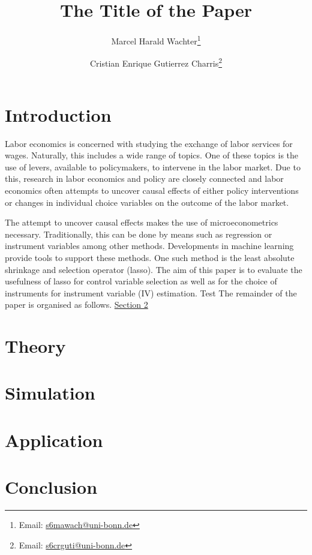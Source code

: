 \documentclass[a4paper,12pt]{article}
\author{Marcel Harald Wachter\thanks{Email: \href{mailto:s6mawach@uni-bonn.de}{s6mawach@uni-bonn.de}} \and Cristian Enrique Gutierrez Charris\thanks{Email: \href{mailto:s6crguti@uni-bonn.de}{s6crguti@uni-bonn.de}}}
\title{The Title of the Paper}
\begin{document}
\maketitle
\thispagestyle{empty}

\begin{singlespace}
\begin{abstract}

\end{abstract}
\end{singlespace}

\newpage
{}

\section{Introduction}
\label{sec:introduction}
Labor economics is concerned with studying the exchange of labor services for wages.
Naturally, this includes a wide range of topics.
One of these topics is the use of levers, available to policymakers, to intervene in the labor market.
Due to this, research in labor economics and policy are closely connected and labor economics often attempts to uncover causal effects of either policy interventions or changes in individual choice variables on the outcome of the labor market.

The attempt to uncover causal effects makes the use of microeconometrics necessary. Traditionally, this can be done by means such as regression or instrument variables among other methods. Developments in machine learning provide tools to support these methods. One such method is the least absolute shrinkage and selection operator (lasso). The aim of this paper is to evaluate the usefulness of lasso for control variable selection as well as for the choice of instruments for instrument variable (IV) estimation.
Test
The remainder of the paper is organised as follows. \hyperref[sec:theory]{Section 2}


\section{Theory}
\label{sec:theory}

\section{Simulation}
\label{sec:simulation}

\section{Application}
\label{sec:application}

\section{Conclusion}
\label{sec:conclusion}
\end{document}
